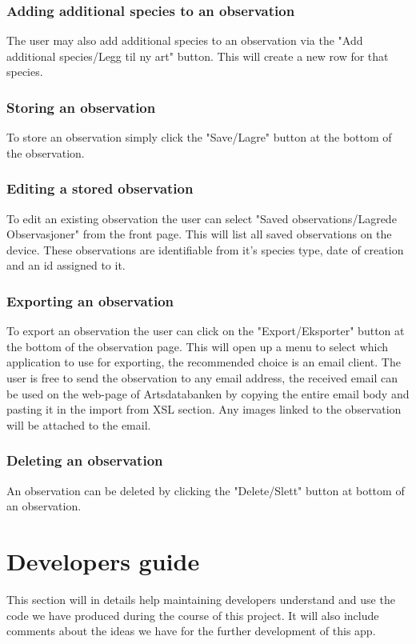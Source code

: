 \subsubsection{Adding additional species to an observation}
The user may also add additional species to an observation via the "Add additional species/Legg til ny art" button. This will create a new row for that species.

\subsubsection{Storing an observation}
To store an observation simply click the "Save/Lagre" button at the bottom of the observation.

\subsubsection{Editing a stored observation}
To edit an existing observation the user can select "Saved observations/Lagrede Observasjoner" from the front page. 
This will list all saved observations on the device. 
These observations are identifiable from it's species type, date of creation and an id assigned to it.

\subsubsection{Exporting an observation}
To export an observation the user can click on the "Export/Eksporter" button at the bottom of the observation page.
This will open up a menu to select which application to use for exporting, the recommended choice is an email client.
The user is free to send the observation to any email address, the received email can be used on the web-page of Artsdatabanken by copying the entire email body and pasting it in the import from XSL section.
Any images linked to the observation will be attached to the email.

\subsubsection{Deleting an observation}
An observation can be deleted by clicking the "Delete/Slett" button at bottom of an observation.

\section{Developers guide}

This section will in details help maintaining developers understand and use the
code we have produced during the course of this project. It will also include
comments about the ideas we have for the further development of this app.


